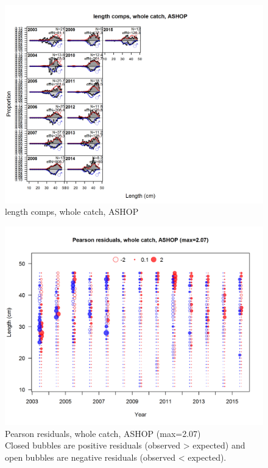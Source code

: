 \documentclass[12pt,]{article}
\begin{document}
\begin{figure}
\centering
\includegraphics{./r4ss/plots_mod1/comp_lenfit_flt2mkt0.png}
\caption{length comps, whole catch, ASHOP
\label{fig:mod1_10_comp_lenfit_flt2mkt0}}
\end{figure}

\begin{figure}
\centering
\includegraphics{./r4ss/plots_mod1/comp_lenfit_residsflt2mkt0.png}
\caption{Pearson residuals, whole catch, ASHOP (max=2.07)\\
Closed bubbles are positive residuals (observed \textgreater{} expected)
and open bubbles are negative residuals (observed \textless{} expected).
\label{fig:mod1_11_comp_lenfit_residsflt2mkt0}}
\end{figure}
\end{document}
